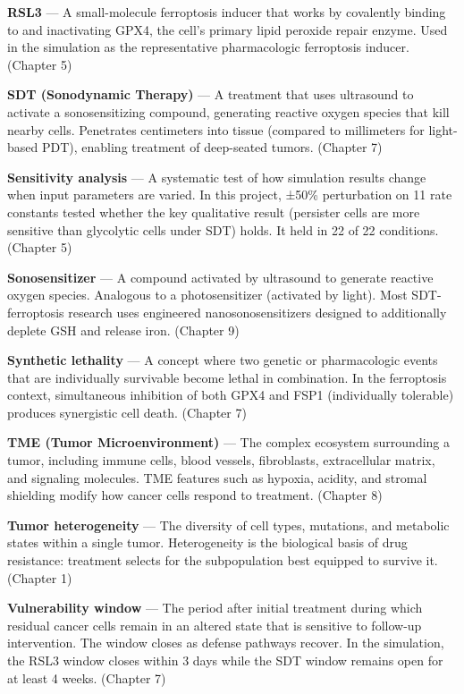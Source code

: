 \documentclass[11pt,twoside,openright]{report}
\begin{document}
\textbf{RSL3} --- A small-molecule ferroptosis inducer that works by covalently binding to and inactivating GPX4, the cell's primary lipid peroxide repair enzyme. Used in the simulation as the representative pharmacologic ferroptosis inducer. (Chapter 5)

\textbf{SDT (Sonodynamic Therapy)} --- A treatment that uses ultrasound to activate a sonosensitizing compound, generating reactive oxygen species that kill nearby cells. Penetrates centimeters into tissue (compared to millimeters for light-based PDT), enabling treatment of deep-seated tumors. (Chapter 7)

\textbf{Sensitivity analysis} --- A systematic test of how simulation results change when input parameters are varied. In this project, ±50\% perturbation on 11 rate constants tested whether the key qualitative result (persister cells are more sensitive than glycolytic cells under SDT) holds. It held in 22 of 22 conditions. (Chapter 5)

\textbf{Sonosensitizer} --- A compound activated by ultrasound to generate reactive oxygen species. Analogous to a photosensitizer (activated by light). Most SDT-ferroptosis research uses engineered nanosonosensitizers designed to additionally deplete GSH and release iron. (Chapter 9)

\textbf{Synthetic lethality} --- A concept where two genetic or pharmacologic events that are individually survivable become lethal in combination. In the ferroptosis context, simultaneous inhibition of both GPX4 and FSP1 (individually tolerable) produces synergistic cell death. (Chapter 7)

\textbf{TME (Tumor Microenvironment)} --- The complex ecosystem surrounding a tumor, including immune cells, blood vessels, fibroblasts, extracellular matrix, and signaling molecules. TME features such as hypoxia, acidity, and stromal shielding modify how cancer cells respond to treatment. (Chapter 8)

\textbf{Tumor heterogeneity} --- The diversity of cell types, mutations, and metabolic states within a single tumor. Heterogeneity is the biological basis of drug resistance: treatment selects for the subpopulation best equipped to survive it. (Chapter 1)

\textbf{Vulnerability window} --- The period after initial treatment during which residual cancer cells remain in an altered state that is sensitive to follow-up intervention. The window closes as defense pathways recover. In the simulation, the RSL3 window closes within 3 days while the SDT window remains open for at least 4 weeks. (Chapter 7)
\end{document}
